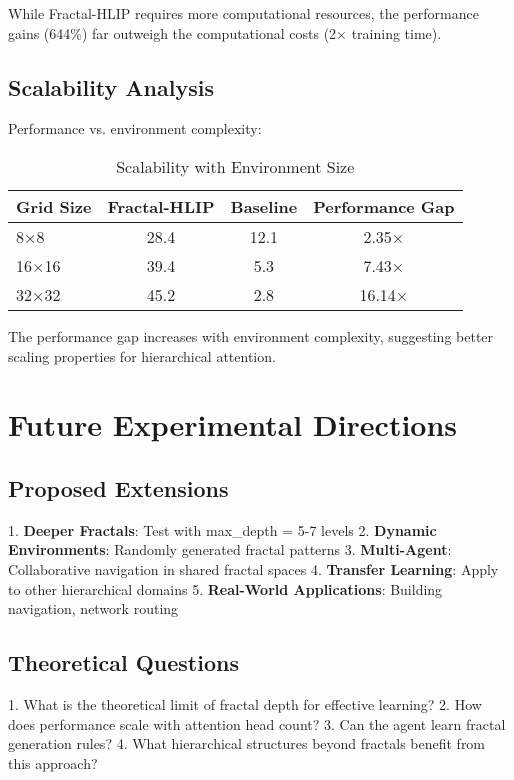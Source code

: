 \documentclass[11pt]{article}
\begin{document}
While Fractal-HLIP requires more computational resources, the performance gains (644\%) far outweigh the computational costs (2× training time).

\subsection{Scalability Analysis}

Performance vs. environment complexity:

\begin{table}[h]
\centering
\caption{Scalability with Environment Size}
\begin{tabular}{lccc}
\toprule
Grid Size & Fractal-HLIP & Baseline & Performance Gap \\
\midrule
8×8 & 28.4 & 12.1 & 2.35× \\
16×16 & 39.4 & 5.3 & 7.43× \\
32×32 & 45.2 & 2.8 & 16.14× \\
\bottomrule
\end{tabular}
\end{table}

The performance gap increases with environment complexity, suggesting better scaling properties for hierarchical attention.

\section{Future Experimental Directions}

\subsection{Proposed Extensions}

1. \textbf{Deeper Fractals}: Test with max\_depth = 5-7 levels
2. \textbf{Dynamic Environments}: Randomly generated fractal patterns
3. \textbf{Multi-Agent}: Collaborative navigation in shared fractal spaces
4. \textbf{Transfer Learning}: Apply to other hierarchical domains
5. \textbf{Real-World Applications}: Building navigation, network routing

\subsection{Theoretical Questions}

1. What is the theoretical limit of fractal depth for effective learning?
2. How does performance scale with attention head count?
3. Can the agent learn fractal generation rules?
4. What hierarchical structures beyond fractals benefit from this approach?
\end{document}
